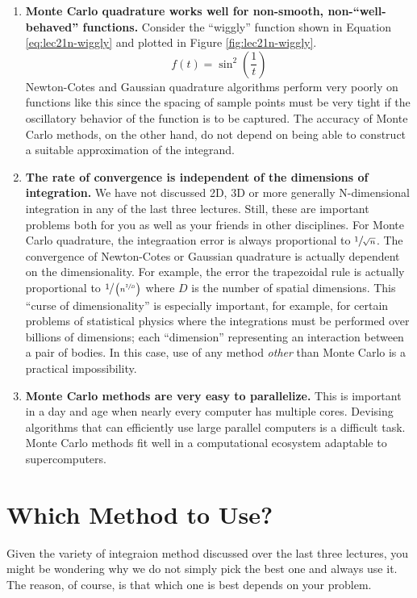 \begin{enumerate}
\item \textbf{Monte Carlo quadrature works well for non-smooth, non-``well-behaved'' functions.}  Consider the ``wiggly'' function shown in Equation \ref{eq:lec21n-wiggly} and plotted in Figure \ref{fig:lec21n-wiggly}.    
\begin{equation}
f(t) = \sin^2{\left(\frac{1}{t} \right)}
\label{eq:lec21n-wiggly}
\end{equation}
Newton-Cotes and Gaussian quadrature algorithms perform very poorly on functions like this since the spacing of sample points must be very tight if the oscillatory behavior of the function is to be captured.  The accuracy of Monte Carlo methods, on the other hand, do not depend on being able to construct a suitable approximation of the integrand.  

\item \textbf{The rate of convergence is independent of the dimensions of integration.} We have not discussed 2D, 3D or more generally N-dimensional integration in any of the last three lectures.  Still, these are important problems both for you as well as your friends in other disciplines.  For Monte Carlo quadrature, the integraation error is always proportional to $\sfrac{1}{\sqrt{n}}$.  The convergence of Newton-Cotes or Gaussian quadrature is actually dependent on the dimensionality.  For example, the error the trapezoidal rule is actually proportional to $\sfrac{1}{\left(n^{\sfrac{2}{D}}\right)}$ where $D$ is the number of spatial dimensions.  This ``curse of dimensionality'' is especially important, for example, for certain problems of statistical physics where the integrations must be performed over billions of dimensions; each ``dimension'' representing an interaction between a pair of bodies.  In this case, use of any method \emph{other} than Monte Carlo is a practical impossibility.

\item \textbf{Monte Carlo methods are very easy to parallelize.} This is important in a day and age when nearly every computer has multiple cores.  Devising algorithms that can efficiently use large parallel computers is a difficult task.  Monte Carlo methods fit well in a computational ecosystem adaptable to supercomputers.

\end{enumerate}

\section{Which Method to Use?}
Given the variety of integraion method discussed over the last three lectures, you might be wondering why we do not simply pick the best one and always use it.  The reason, of course, is that which one is best depends on your problem.  

